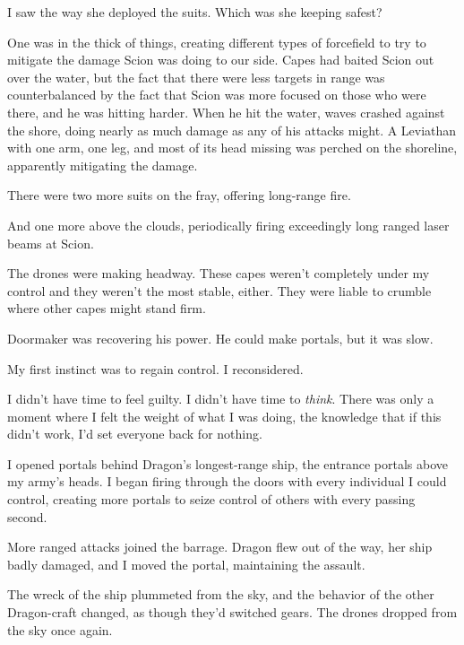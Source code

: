 I saw the way she deployed the suits.  Which was she keeping safest?



One was in the thick of things, creating different types of forcefield to try to mitigate the damage Scion was doing to our side.  Capes had baited Scion out over the water, but the fact that there were less targets in range was counterbalanced by the fact that Scion was more focused on those who were there, and he was hitting harder.  When he hit the water, waves crashed against the shore, doing nearly as much damage as any of his attacks might.  A Leviathan with one arm, one leg, and most of its head missing was perched on the shoreline, apparently mitigating the damage.



There were two more suits on the fray, offering long-range fire.



And one more above the clouds, periodically firing exceedingly long ranged laser beams at Scion.



The drones were making headway.  These capes weren't completely under my control and they weren't the most stable, either.  They were liable to crumble where other capes might stand firm.



Doormaker was recovering his power.  He could make portals, but it was slow.



My first instinct was to regain control.  I reconsidered.



I didn't have time to feel guilty.  I didn't have time to \emph{think}.  There was only a moment where I felt the weight of what I was doing, the knowledge that if this didn't work, I'd set everyone back for nothing.



I opened portals behind Dragon's longest-range ship, the entrance portals above my army's heads.  I began firing through the doors with every individual I could control, creating more portals to seize control of others with every passing second.



More ranged attacks joined the barrage.  Dragon flew out of the way, her ship badly damaged, and I moved the portal, maintaining the assault.



The wreck of the ship plummeted from the sky, and the behavior of the other Dragon-craft changed, as though they'd switched gears.  The drones dropped from the sky once again.



